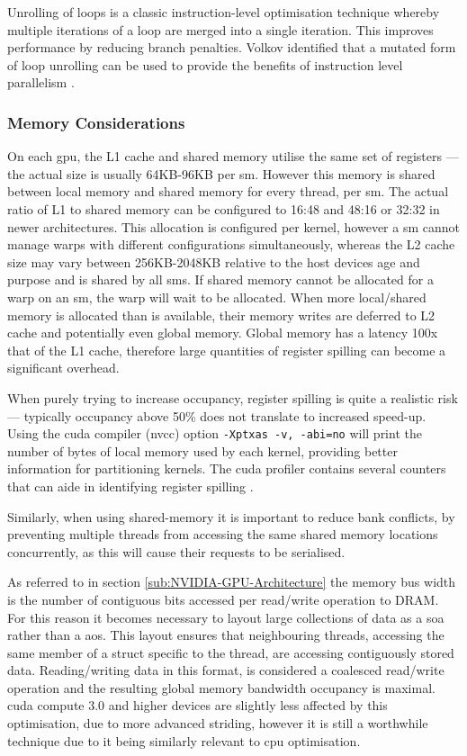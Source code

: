         Unrolling of loops is a classic instruction-level optimisation technique  whereby multiple iterations of a loop are merged into a single iteration. This improves performance by reducing branch penalties. Volkov identified that a mutated form of loop unrolling can be used to provide the benefits of instruction level parallelism \cite{VV11}.

      \subsubsection*{Memory Considerations}
        On each \gls{gpu}, the L1 cache and shared memory utilise the same set of registers --- the actual size is usually 64KB-96KB per \gls{sm}. However this memory is shared between local memory and shared memory for every thread, per \gls{sm}. The actual ratio of L1 to shared memory can be configured to 16:48 and 48:16 or 32:32 in newer architectures. This allocation is configured per kernel, however a \gls{sm} cannot manage warps with different configurations simultaneously, whereas the L2 cache size may vary between 256KB-2048KB relative to the host devices age and purpose and is shared by all \glspl{sm}. If shared memory cannot be allocated for a warp on an \gls{sm}, the warp will wait to be allocated. When more local/shared memory is allocated than is available, their memory writes are deferred to L2 cache and potentially even global memory. Global memory has a latency 100x that of the L1 cache, therefore large quantities of register spilling can become a significant overhead. 

        When purely trying to increase occupancy, register spilling is quite a realistic risk --- typically occupancy above 50\% does not translate to increased speed-up. Using the \gls{cuda} compiler (\gls{nvcc}) option \lstinline!-Xptxas -v, -abi=no! will print the number of bytes of local memory used by each kernel, providing better information for partitioning kernels. The \gls{cuda} profiler contains several counters that can aide in identifying register spilling \cite{PM11}.
        
        Similarly, when using shared-memory it is important to reduce bank conflicts, by preventing multiple threads from accessing the same shared memory locations concurrently, as this will cause their requests to be serialised.

        As referred to in section \ref{sub:NVIDIA-GPU-Architecture} the memory bus width is the number of contiguous bits accessed per read/write operation to DRAM. For this reason it becomes necessary to layout large collections of data as a \gls{soa} rather than a \gls{aos}. This layout ensures that neighbouring threads, accessing the same member of a struct specific to the thread, are accessing contiguously stored data. Reading/writing data in this format, is considered a coalesced read/write operation and the resulting global memory bandwidth occupancy is maximal. \gls{cuda} compute 3.0 and higher devices are slightly less affected by this optimisation, due to more advanced striding, however it is still a worthwhile technique due to it being similarly relevant to \gls{cpu} optimisation.

